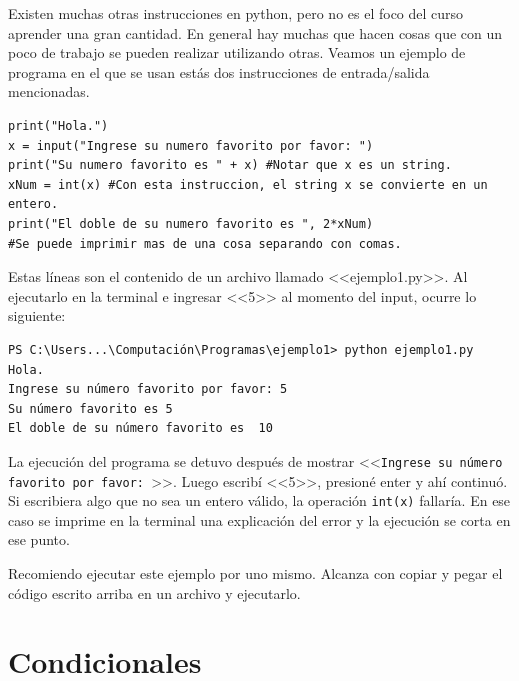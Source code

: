 \documentclass[a4paper, 12pt]{report}
\theoremstyle{definition}
\begin{document}
Existen muchas otras instrucciones en python, pero no es el foco del curso aprender una gran cantidad. En general hay muchas que hacen cosas que con un poco de trabajo se pueden realizar utilizando otras. Veamos un ejemplo de programa en el que se usan estás dos instrucciones de entrada/salida mencionadas.
\begin{verbatim}
print("Hola.")
x = input("Ingrese su numero favorito por favor: ")
print("Su numero favorito es " + x) #Notar que x es un string.
xNum = int(x) #Con esta instruccion, el string x se convierte en un entero.
print("El doble de su numero favorito es ", 2*xNum)
#Se puede imprimir mas de una cosa separando con comas.
\end{verbatim}
Estas líneas son el contenido de un archivo llamado <<ejemplo1.py>>. Al ejecutarlo en la terminal e ingresar <<5>> al momento del input, ocurre lo siguiente:
\begin{verbatim}
PS C:\Users...\Computación\Programas\ejemplo1> python ejemplo1.py
Hola.
Ingrese su número favorito por favor: 5
Su número favorito es 5
El doble de su número favorito es  10
\end{verbatim}
La ejecución del programa se detuvo después de mostrar <<{\tt Ingrese su número favorito por favor: }>>. Luego escribí <<5>>, presioné enter y ahí continuó. Si escribiera algo que no sea un entero válido, la operación {\tt int(x)} fallaría. En ese caso se imprime en la terminal una explicación del error y la ejecución se corta en ese punto.

Recomiendo ejecutar este ejemplo por uno mismo. Alcanza con copiar y pegar el código escrito arriba en un archivo y ejecutarlo.

\section{Condicionales}
\end{document}
